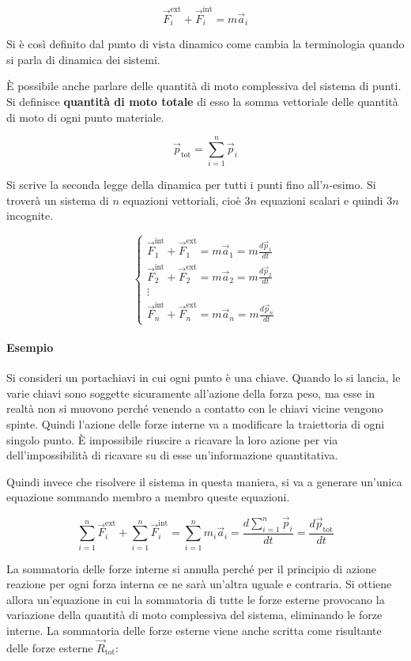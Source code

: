 \[
	\vec{F}_i^\text{ext}+\vec{F}_i^\text{int}=m\vec{a}_i
\]

Si è così definito dal punto di vista dinamico come cambia la terminologia quando si parla di dinamica dei sistemi.

È possibile anche parlare delle quantità di moto complessiva del sistema di punti. Si definisce \textbf{quantità di moto totale} di esso la somma vettoriale delle quantità di moto di ogni punto materiale.

\[
	\vec{p}_\text{tot}=\sum_{i=1}^n \vec{p}_i
\]

Si scrive la seconda legge della dinamica per tutti i punti fino all'$n$-esimo. Si troverà un sistema di $n$ equazioni vettoriali, cioè $3n$ equazioni scalari e quindi $3n$ incognite.

\[
	\begin{cases}
		\vec{F}_1^\text{int} + \vec{F}_1^\text{ext}=m\vec{a}_1=m\frac{d\vec{p}_1}{dt} \\
		\vec{F}_2^\text{int} + \vec{F}_2^\text{ext}=m\vec{a}_2=m\frac{d\vec{p}_2}{dt} \\
		\vdots \\
		\vec{F}_n^\text{int} + \vec{F}_n^\text{ext}=m\vec{a}_n=m\frac{d\vec{p}_n}{dt}
	\end{cases}
\]

\paragraph{Esempio} Si consideri un portachiavi in cui ogni punto è una chiave. Quando lo si lancia, le varie chiavi sono soggette sicuramente all'azione della forza peso, ma esse in realtà non si muovono perché venendo a contatto con le chiavi vicine vengono spinte. Quindi l'azione delle forze interne va a modificare la traiettoria di ogni singolo punto. È impossibile riuscire a ricavare la loro azione per via dell'impossibilità di ricavare su di esse un'informazione quantitativa.

Quindi invece che risolvere il sistema in questa maniera, si va a generare un'unica equazione sommando membro a membro queste equazioni.

\[
	\sum_{i=1}^n \vec{F}_i^\text{ext}+\sum_{i=1}^n \vec{F}_i^\text{int}=\sum_{i=1}^nm_i\vec{a}_i=\frac{d\sum_{i=1}^n\vec{p}_i}{dt}=\frac{d\vec{p}_\text{tot}}{dt}
\]

La sommatoria delle forze interne si annulla perché per il principio di azione reazione per ogni forza interna ce ne sarà un'altra uguale e contraria. Si ottiene allora un'equazione in cui la sommatoria di tutte le forze esterne provocano la variazione della quantità di moto complessiva del sistema, eliminando le forze interne. La sommatoria delle forze esterne viene anche scritta come risultante delle forze esterne $\vec{R}_\text{tot}$:

